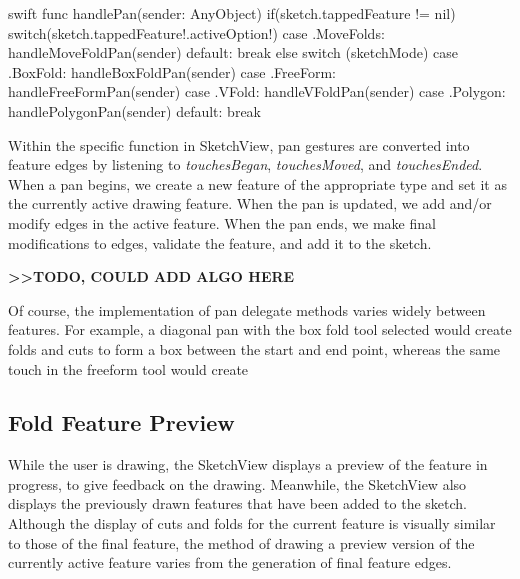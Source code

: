 \small
\singlespacing 

\begin{pygmented}{swift}
    func handlePan(sender: AnyObject) {
        if(sketch.tappedFeature != nil){
            switch(sketch.tappedFeature!.activeOption!){
            case .MoveFolds:
                handleMoveFoldPan(sender)
            default: break
            }
        }
        else{
            switch (sketchMode) {
            case .BoxFold:
                handleBoxFoldPan(sender)
            case .FreeForm:
                handleFreeFormPan(sender)
            case .VFold:
                handleVFoldPan(sender)
            case .Polygon:
                handlePolygonPan(sender)
            default:
                break
            }
        }
    }
\end{pygmented}

\doublespacing
\normalsize

Within the specific function in SketchView, pan gestures are converted
into feature edges by listening to \emph{touchesBegan},
\emph{touchesMoved}, and \emph{touchesEnded}. When a pan begins, we
create a new feature of the appropriate type and set it as the currently
active drawing feature. When the pan is updated, we add and/or modify
edges in the active feature. When the pan ends, we make final
modifications to edges, validate the feature, and add it to the sketch.

\textbf{\textgreater{}\textgreater{}TODO, COULD ADD ALGO HERE}

Of course, the implementation of pan delegate methods varies widely
between features. For example, a diagonal pan with the box fold tool
selected would create folds and cuts to form a box between the start and
end point, whereas the same touch in the freeform tool would create

\subsection{Fold Feature Preview}\label{fold-feature-preview}

While the user is drawing, the SketchView displays a preview of the
feature in progress, to give feedback on the drawing. Meanwhile, the
SketchView also displays the previously drawn features that have been
added to the sketch. Although the display of cuts and folds for the
current feature is visually similar to those of the final feature, the
method of drawing a preview version of the currently active feature
varies from the generation of final feature edges.

